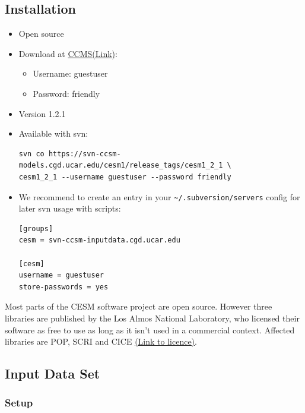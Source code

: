 \documentclass[]{article}
\providecommand{\tightlist}{%
  \setlength{\itemsep}{0pt}\setlength{\parskip}{0pt}}
\begin{document}
\subsection{Installation}\label{installation-1}

\begin{itemize}
\item
  Open source
\item
  Download at
  \href{http://www.cesm.ucar.edu/models/cesm1.2/cesm/doc/usersguide/x290.html\#download_ccsm_code}{CCMS(Link)}:

  \begin{itemize}
  \tightlist
  \item
    Username: guestuser
  \item
    Password: friendly
  \end{itemize}
\item
  Version 1.2.1
\item
  Available with svn:

\begin{verbatim}
svn co https://svn-ccsm-models.cgd.ucar.edu/cesm1/release_tags/cesm1_2_1 \
cesm1_2_1 --username guestuser --password friendly
\end{verbatim}
\item
  We recommend to create an entry in your
  \texttt{\textasciitilde{}/.subversion/servers} config for later svn
  usage with scripts:

\begin{verbatim}
[groups]
cesm = svn-ccsm-inputdata.cgd.ucar.edu

[cesm]
username = guestuser
store-passwords = yes
\end{verbatim}
\end{itemize}

Most parts of the CESM software project are open source. However three
libraries are published by the Los Almos National Laboratory, who
licensed their software as free to use as long as it isn't used in a
commercial context. Affected libraries are POP, SCRI and CICE
\href{http://www.cesm.ucar.edu/management/UofCAcopyright.ccsm3.html}{(Link
to licence)}.

\subsection{Input Data Set}\label{input-data-set}

\subsubsection{Setup}\label{setup}
\end{document}
